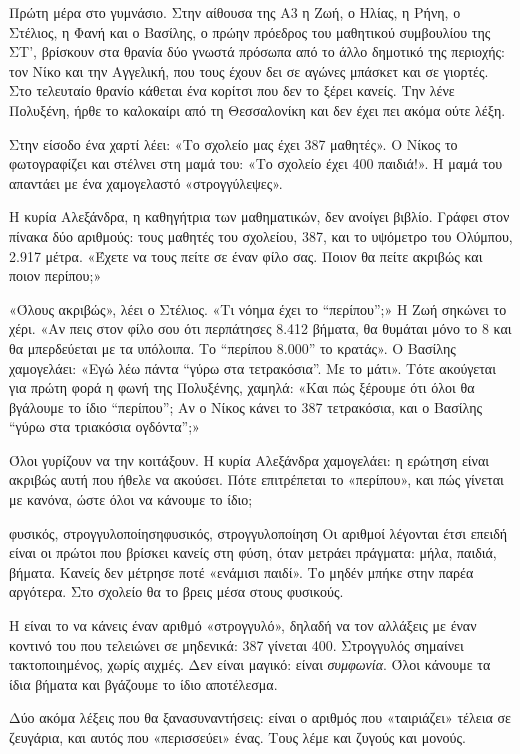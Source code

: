 
\begin{anagke}
Πρώτη μέρα στο γυμνάσιο. Στην αίθουσα της Α3 η Ζωή, ο Ηλίας, η Ρήνη, ο Στέλιος, η Φανή και ο Βασίλης, ο πρώην πρόεδρος του μαθητικού συμβουλίου της ΣΤ’, βρίσκουν στα θρανία δύο γνωστά πρόσωπα από το άλλο δημοτικό της περιοχής: τον Νίκο και την Αγγελική, που τους έχουν δει σε αγώνες μπάσκετ και σε γιορτές. Στο τελευταίο θρανίο κάθεται ένα κορίτσι που δεν το ξέρει κανείς. Την λένε Πολυξένη, ήρθε το καλοκαίρι από τη Θεσσαλονίκη και δεν έχει πει ακόμα ούτε λέξη.

Στην είσοδο ένα χαρτί λέει: «Το σχολείο μας έχει 387 μαθητές». Ο Νίκος το φωτογραφίζει και στέλνει στη μαμά του: «Το σχολείο έχει 400 παιδιά!». Η μαμά του απαντάει με ένα χαμογελαστό «στρογγύλεψες».

Η κυρία Αλεξάνδρα, η καθηγήτρια των μαθηματικών, δεν ανοίγει βιβλίο. Γράφει στον πίνακα δύο αριθμούς: τους μαθητές του σχολείου, 387, και το υψόμετρο του Ολύμπου, 2.917 μέτρα. «Έχετε να τους πείτε σε έναν φίλο σας. Ποιον θα πείτε ακριβώς και ποιον περίπου;»

«Όλους ακριβώς», λέει ο Στέλιος. «Τι νόημα έχει το “περίπου”;» Η Ζωή σηκώνει το χέρι. «Αν πεις στον φίλο σου ότι περπάτησες 8.412 βήματα, θα θυμάται μόνο το 8 και θα μπερδεύεται με τα υπόλοιπα. Το “περίπου 8.000” το κρατάς». Ο Βασίλης χαμογελάει: «Εγώ λέω πάντα “γύρω στα τετρακόσια”. Με το μάτι». Τότε ακούγεται για πρώτη φορά η φωνή της Πολυξένης, χαμηλά: «Και πώς ξέρουμε ότι όλοι θα βγάλουμε το ίδιο “περίπου”; Αν ο Νίκος κάνει το 387 τετρακόσια, και ο Βασίλης “γύρω στα τριακόσια ογδόντα”;»

Όλοι γυρίζουν να την κοιτάξουν. Η κυρία Αλεξάνδρα χαμογελάει: η ερώτηση είναι ακριβώς αυτή που ήθελε να ακούσει. Πότε επιτρέπεται το «περίπου», και πώς γίνεται με κανόνα, ώστε όλοι να κάνουμε το ίδιο;
\end{anagke}

\begin{lexi}{φυσικός, στρογγυλοποίηση}{φυσικός, στρογγυλοποίηση}
Οι  αριθμοί λέγονται έτσι επειδή είναι οι πρώτοι που βρίσκει κανείς στη φύση, όταν μετράει πράγματα: μήλα, παιδιά, βήματα. Κανείς δεν μέτρησε ποτέ «ενάμισι παιδί». Το μηδέν μπήκε στην παρέα αργότερα. Στο σχολείο θα το βρεις μέσα στους φυσικούς.

Η  είναι το να κάνεις έναν αριθμό «στρογγυλό», δηλαδή να τον αλλάξεις με έναν κοντινό του που τελειώνει σε μηδενικά: 387 γίνεται 400. Στρογγυλός σημαίνει τακτοποιημένος, χωρίς αιχμές. Δεν είναι μαγικό: είναι \emph{συμφωνία}. Όλοι κάνουμε τα ίδια βήματα και βγάζουμε το ίδιο αποτέλεσμα.

Δύο ακόμα λέξεις που θα ξανασυναντήσεις:  είναι ο αριθμός που «ταιριάζει» τέλεια σε ζευγάρια, και  αυτός που «περισσεύει» ένας. Τους λέμε και ζυγούς και μονούς.
\end{lexi}

